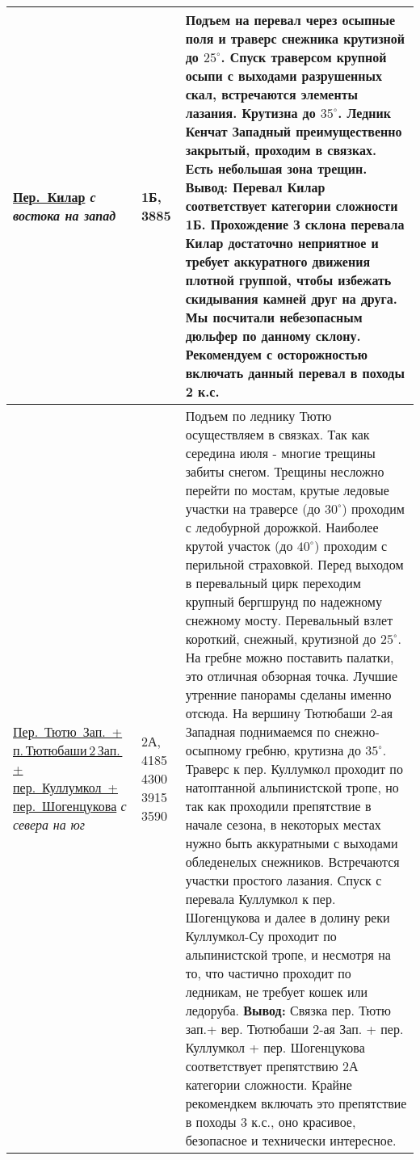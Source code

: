 {\begin{longtable}{|>{\centering\arraybackslash}m{3.8cm}|>{\centering\arraybackslash}m{1.3cm}|>{\raggedright\arraybackslash}m{12.5cm}|}
			\hyperref[subsec:Day16]{Пер.~Килар}																		\newline\textit{с востока на запад}		&	1Б, 3885					&	Подъем на перевал через осыпные поля и траверс снежника крутизной до $25^\circ$. Спуск траверсом крупной осыпи с выходами разрушенных скал, встречаются элементы лазания. Крутизна до $35^\circ$. Ледник Кенчат Западный преимущественно закрытый, проходим в связках. Есть небольшая зона трещин. \newline \textbf{Вывод:} Перевал Килар соответствует категории сложности 1Б. Прохождение З склона перевала Килар достаточно неприятное и требует аккуратного движения плотной группой, чтобы избежать скидывания камней друг на друга. Мы посчитали небезопасным дюльфер по данному склону. Рекомендуем с осторожностью включать данный перевал в походы 2 к.с.																																																																																																																																																																																																																																																																																																																																																	\\ \hline
			\hyperref[subsec:Day17]{Пер.~Тютю~Зап.~+ п.\,Тютюбаши\,2\,Зап.\,+ пер.~Куллумкол~+ пер.~Шогенцукова}	\newline\textit{с севера на юг}			&	2А,	4185 4300 3915 3590		&	Подъем по леднику Тютю осуществляем в связках. Так как середина июля - многие трещины забиты снегом. Трещины несложно перейти по мостам, крутые ледовые участки на траверсе (до $30^\circ$) проходим с ледобурной дорожкой. Наиболее крутой участок (до $40^\circ$) проходим с перильной страховкой. Перед выходом в перевальный цирк переходим крупный бергшрунд по надежному снежному мосту. Перевальный взлет короткий, снежный, крутизной до $25^\circ$. На гребне можно поставить палатки, это отличная обзорная точка. Лучшие утренние панорамы сделаны именно отсюда. На вершину Тютюбаши 2-ая Западная поднимаемся по снежно-осыпному гребню, крутизна до $35^\circ$. Траверс к пер. Куллумкол проходит по натоптанной альпинистской тропе, но так как проходили препятствие в начале сезона, в некоторых местах нужно быть аккуратными с выходами обледенелых снежников. Встречаются участки простого лазания. Спуск с перевала Куллумкол к пер. Шогенцукова и далее в долину реки Куллумкол-Су проходит по альпинистской тропе, и несмотря на то, что частично проходит по ледникам, не требует кошек или ледоруба. \newline \textbf{Вывод:} Связка пер. Тютю зап.+ вер. Тютюбаши 2-ая Зап. + пер. Куллумкол + пер. Шогенцукова соответствует препятствию 2А категории сложности. Крайне рекомендкем включать это препятствие в походы 3 к.с., оно красивое, безопасное и технически интересное.																																																																																																																																																														\\ \hline
		\end{longtable}}
